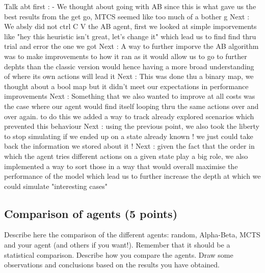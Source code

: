 \documentclass[11pt,a4paper]{report}
\begin{document}
\begin{answers}[21cm]
    Talk abt first : - We thought about going with AB since this is what gave us the best results from the get go, MTCS seemed like too much of a bother ^^'
    Next : We absly did not ctrl C V the AB agent, first we looked at simple imporvements like "hey this heuristic isn't great, let's change it" which lead us to find find thru trial and error the one we got
    Next : A way to further imporve the AB algorithm was to make improvements to how it ran as it would allow us to go to further dephts than the classic version would hence having a more broad understanding of where its own actions will lead it 
    Next : This was done thu a binary map, we thought about a bool map but it didn't meet our expectations in performance improvements 
    Next : Something that we also wanted to improve at all costs was the case where our agent would find itself looping thru the same actions over and over again. to do this we added a way to track already explored scenarios which prevented this behaviour
    Next : using the previous point, we also took the liberty to stop simulating if we ended up on a state already known ! we just could take back the information we stored about it ! 
    Next : given the fact that the order in which the agent tries different actions on a given state play a big role, we also implemented a way to sort those in a way that would overall maximise the performance of the model which lead us to further increase the depth at which we could simulate "interesting cases"    
\end{answers}

\begin{answers}[23cm]
\end{answers}

\begin{answers}[23cm]
\end{answers}



\newpage
\subsection{Comparison of agents (5 points)}
Describe here the comparison of the different agents: random, Alpha-Beta, MCTS and your agent (and others if you want!). Remember that it should be a statistical comparison. Describe how you compare the agents. Draw some observations and conclusions based on the results you have obtained.
\end{document}
